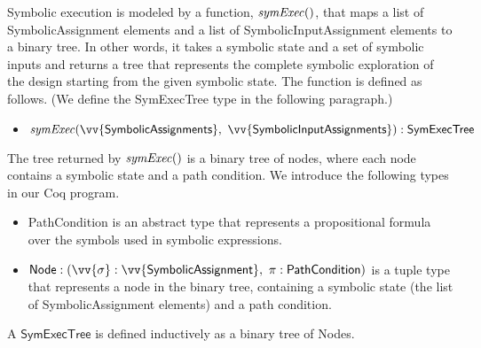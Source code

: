 Symbolic execution is modeled by a function, $\mathit{symExec}()$, that maps a list
of \textsf{SymbolicAssignment} elements and a list of
\textsf{SymbolicInputAssignment} elements to a binary tree. In other words, it
takes a symbolic state and a set of symbolic inputs and returns a tree that
represents the complete symbolic exploration of the design starting from the given symbolic state. The function is defined as
follows. (We define the \textsf{SymExecTree} type in the following paragraph.)

\begin{itemize}
\item $\symexecution (\vv{\textsf{SymbolicAssignments}},~ 
  \vv{\textsf{SymbolicInputAssignments}}) : \textsf{SymExecTree}$
\end{itemize}

The tree returned by $\mathit{symExec}()$ is a binary tree of nodes, where each
node contains a symbolic state and a path condition. We introduce the following
types in our Coq program.

\begin{itemize}
\item \textsf{PathCondition} is an abstract type that represents a
  propositional formula over the symbols used in symbolic expressions.
\item $\textsf{Node} : (\vv{\sigma} : \vv{\textsf{SymbolicAssignment}},~ \pi :
  \textsf{PathCondition})$ is a tuple type that represents a node in the
  binary tree, containing a symbolic state (the list of
  \textsf{SymbolicAssignment} elements) and a path condition.
\end{itemize}

A $\textsf{SymExecTree}$ is defined inductively as a binary tree of \textsf{Node}s.





